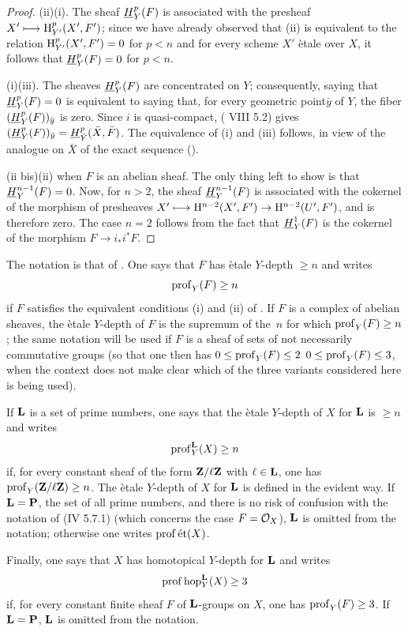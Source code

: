 \begin{proof}
\textup{(ii)}\ALORS \textup{(i)}. The sheaf ${\h}_Y^p(F)$ is associated with the presheaf $X'\mto \H_{Y'}^p(X', F')$; since we have already observed that \textup{(ii)} is equivalent to the relation $\H_{Y'}^p(X', F')=0$ for $p<n$ and for every scheme $X'$ \`etale over $X$, it follows that ${\h}_Y^p(F)=0$ for $p<n$.

\textup{(i)}\SSI \textup{(iii)}. The sheaves ${\h}_Y^p(F)$ are concentrated on $Y$; consequently, saying that ${\h}_Y^p(F)=0$ is equivalent to saying that, for every geometric point\pageoriginale $\bar y$ of $Y$, the fiber $({\h}_Y^p(F))_{\bar y}$ is zero. Since $i$ is quasi-compact, ( VIII 5.2) gives $({\h}_Y^p(F))_{\bar y}={\h}_{\bar Y}^p(\bar X, \bar F)$. The equivalence of \textup{(i)} and \textup{(iii)} follows, in view of the analogue on $\bar X$ of the exact sequence ().

(ii bis)\ALORS \textup{(ii)} when $F$ is an abelian sheaf. The only thing left to show is that ${\h}_Y^{n-1}(F)=0$. Now, for $n>2$, the sheaf ${\h}_Y^{n-1}(F)$ is associated with the cokernel of the morphism of presheaves $X'\mto \H^{n-2}(X', F')\to\H^{n-2}(U', F')$, and is therefore zero. The case $n=2$ follows from the fact that ${\h}_Y^1(F)$ is the cokernel of the morphism $F\to i_*i^*F$.
\skipqed
\end{proof}

\begin{definition} \label{XIV.1.2}
The notation is that of . One says that $F$ has \`etale $Y$-depth $\geq n$ and writes
$$
\prof_Y(F)\geq n$$
if $F$ satisfies the equivalent conditions \textup{(i)} and \textup{(ii)} of . If $F$ is a complex of abelian sheaves, the \`etale $Y$-depth of $F$ is the supremum of the~$n$ for which $\prof_Y(F)\geq n$; the same notation will be used if $F$ is a sheaf of sets \resp of not necessarily commutative groups (so that one then has $0\leq \prof_Y(F)\leq 2$\sisi{}{,} \resp $0\leq \prof_Y(F)\leq 3$, when the context does not make clear which of the three variants considered here is being used).

If $\LL$ is a set of prime numbers, one says that the \`etale $Y$-depth of $X$ for $\LL$ is $\geq n$ and writes
$$
\prof_Y^{\LL}(X)\geq n
$$
if, for every constant sheaf of the form $\ZZ/\ell\ZZ$ with $\ell\in \LL$, one has $\prof_Y(\ZZ/\ell\ZZ)\geq n$\pageoriginale. The \`etale $Y$-depth of $X$ for $\LL$ is defined in the evident way. If $\LL=\PP$, the set of all prime numbers, and there is no risk of confusion with the notation of \textup{(\EGA IV 5.7.1)} (which concerns the case $F=\OX$), $\LL$ is omitted from the notation; otherwise one writes $\prof \et(X)$.

Finally, one says that $X$ has homotopical $Y$-depth  for $\LL \sisi{\geq 3}{}$ and writes
$$
\prof \hop_Y^{\LL}(X)\geq 3$$
if, for every constant finite sheaf $F$ of $\LL$-groups on $X$, one has $\prof_Y(F)\geq 3$. If $\LL=\PP$, $\LL$ is omitted from the notation.
\end{definition}

